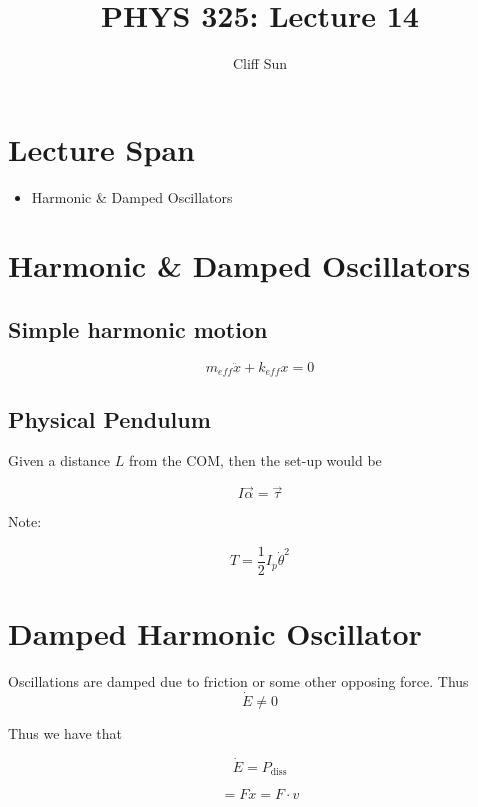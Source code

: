 \documentclass{article}
\title{PHYS 325: Lecture 14}
\author{Cliff Sun}
\newtheorem{one minute paper}[theorem]{One Minute Paper}
\begin{document}
\maketitle

\section*{Lecture Span}
\begin{itemize}
    \item Harmonic \& Damped Oscillators
\end{itemize}

\section*{Harmonic \& Damped Oscillators}

\subsection*{Simple harmonic motion}

\begin{equation}
    m_{eff}\ddot{x} + k_{eff}x = 0
\end{equation}

\subsection*{Physical Pendulum}

Given a distance $L$ from the COM, then the set-up would be 

\begin{equation}
    I\vec{\alpha} = \vec{\tau}
\end{equation}

Note:

\begin{equation}
    T = \frac{1}{2}I_p\dot{\theta}^2
\end{equation}

\section*{Damped Harmonic Oscillator}

Oscillations are damped due to friction or some other opposing force. Thus 
\begin{equation}
    \dot{E} \neq 0 
\end{equation}

Thus we have that 

\begin{equation}
    \dot{E} = P_{\text{diss}}
\end{equation}

\begin{equation}
     = F \dot{x} = F \cdot v
\end{equation}
\end{document}
